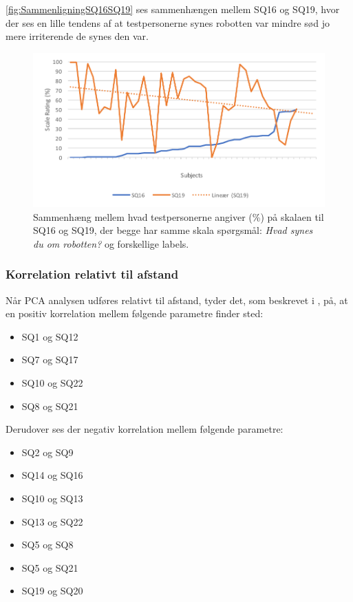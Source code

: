 \noindent
%
\autoref{fig:SammenligningSQ16SQ19} ses sammenhængen mellem SQ16 og SQ19, hvor der ses en lille tendens af at testpersonerne synes robotten var mindre sød jo mere irriterende de synes den var. 
%
\begin{figure}[H]
	\centering
	\includegraphics[width=\textwidth]{Figure/Korrelationsgrafer/SQ16+SQ19}
	\caption{Sammenhæng mellem hvad testpersonerne angiver (\%) på skalaen til SQ16 og SQ19, der begge har samme skala spørgsmål: \textit{Hvad synes du om robotten?} og forskellige labels.}
	\label{fig:SammenligningSQ16SQ19}
\end{figure}

\subsubsection{Korrelation relativt til afstand}
Når PCA analysen udføres relativt til afstand, tyder det, som beskrevet i , på, at en positiv korrelation mellem følgende parametre finder sted:
\begin{itemize}
	\item SQ1 og SQ12
	\item SQ7 og SQ17
	\item SQ10 og SQ22
	\item SQ8 og SQ21
\end{itemize}
%
Derudover ses der negativ korrelation mellem følgende parametre:
\begin{itemize}
	\item SQ2 og SQ9
	\item SQ14 og SQ16
	\item SQ10 og SQ13
	\item SQ13 og SQ22
	\item SQ5 og SQ8
	\item SQ5 og SQ21
	\item SQ19 og SQ20
\end{itemize}


